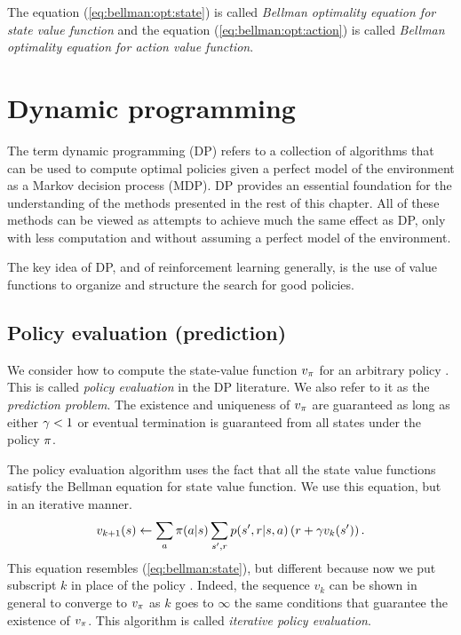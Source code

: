 The equation (\ref{eq:bellman:opt:state}) is called \emph{Bellman optimality equation for state value function}
and the equation (\ref{eq:bellman:opt:action}) is called \emph{Bellman optimality equation for action value function}.


\section{Dynamic programming}

The term dynamic programming (DP)
refers to a collection of algorithms that
can be used to compute optimal policies given a perfect model of the environment as a Markov decision process (MDP).
DP provides an essential foundation for the understanding of the methods presented in the rest of this chapter.
All of these methods can be viewed as attempts to achieve much the same effect as DP,
only with less computation and without assuming a perfect model of the environment.

The key idea of DP, and of reinforcement learning generally, is the use of value functions to organize and structure the search for good policies.


\subsection{Policy evaluation (prediction)}

We consider how to compute the state-value function $v_{\pi}$ for an arbitrary policy \pol.
This is called \emph{policy evaluation} in the DP literature. We also refer to it as the \emph{prediction problem}.
The existence and uniqueness of $v_{\pi}$ are guaranteed as long as either $\gamma < 1$
or eventual termination is guaranteed from all states under the policy $\pi$.

The policy evaluation algorithm uses the fact that all the state value functions satisfy the Bellman equation for state value function.
We use this equation, but in an iterative manner.
\begin{equation}
v_{k+1}(s)
\leftarrow \sum_a \pi(a|s) \sum_{{s'}, r} p({s'}, r|s,a) \left( r + \gamma v_{k}({s'}) \right).
\end{equation}
This equation resembles (\ref{eq:bellman:state}), but different because now we put subscript $k$ in place of the policy \pol.
Indeed, the sequence $v_k$
can be shown in general to converge to $v_{\pi}$ as $k$ goes to $\infty$
the same conditions that guarantee the existence of $v_{\pi}$.
This algorithm is called \emph{iterative policy evaluation}.

